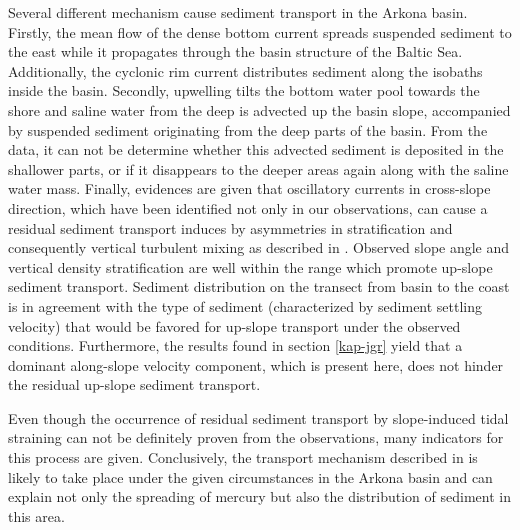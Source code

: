Several different mechanism cause sediment transport in the Arkona basin. 
Firstly, the mean flow of 
the dense bottom current spreads suspended sediment to the east while it 
propagates through the basin structure of the Baltic Sea. Additionally, the 
cyclonic rim current distributes sediment along the isobaths inside the basin. 
Secondly, upwelling tilts the bottom water pool towards the shore and saline 
water from the deep is advected up the basin slope, accompanied by 
suspended sediment originating from the deep parts of the basin. From the data, 
it can not be determine whether this advected sediment is deposited in the 
shallower parts, or if it disappears to the deeper areas again along with the 
saline water mass. Finally, evidences are given that oscillatory currents 
in cross-slope direction, which have been identified not only in our 
observations, can cause a residual sediment transport induces by asymmetries in 
stratification and consequently vertical turbulent mixing as described in 
\cite{schulzumlauf2016}. Observed slope angle and vertical density 
stratification are well within the range which promote up-slope sediment 
transport. Sediment distribution on the transect from basin to the coast is in 
agreement with the type of sediment (characterized by sediment settling 
velocity) that would be favored for up-slope transport under the observed 
conditions. Furthermore, the results found in section \ref{kap-jgr} yield that 
a dominant along-slope velocity component, which is present here, does not 
hinder the residual up-slope sediment transport.

Even though the occurrence of residual sediment transport by slope-induced tidal 
straining can not be definitely proven from the observations, many indicators 
for this process are given. Conclusively, the transport 
mechanism described in \cite{schulzumlauf2016} is likely to take place under 
the given circumstances in the Arkona basin and can explain not only the 
spreading of mercury but also the distribution of sediment in this area.